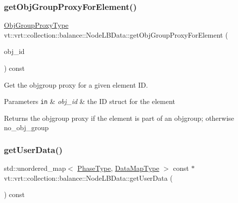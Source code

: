 \subsubsection{\texorpdfstring{get\+Obj\+Group\+Proxy\+For\+Element()}{getObjGroupProxyForElement()}}
{\footnotesize\ttfamily \hyperlink{namespacevt_ad7cae989df485fccca57f0792a880a8e}{Obj\+Group\+Proxy\+Type} vt\+::vrt\+::collection\+::balance\+::\+Node\+L\+B\+Data\+::get\+Obj\+Group\+Proxy\+For\+Element (\begin{DoxyParamCaption}\item[{\hyperlink{namespacevt_1_1vrt_1_1collection_1_1balance_a9f5b53fafb270212279a4757d2c4cd28}{Element\+I\+D\+Struct}}]{obj\+\_\+id }\end{DoxyParamCaption}) const}



Get the objgroup proxy for a given element ID. 


\begin{DoxyParams}[1]{Parameters}
\mbox{\tt in}  & {\em obj\+\_\+id} & the ID struct for the element\\
\hline
\end{DoxyParams}
\begin{DoxyReturn}{Returns}
the objgroup proxy if the element is part of an objgroup; otherwise {\ttfamily no\+\_\+obj\+\_\+group} 
\end{DoxyReturn}
\mbox{\label{structvt_1_1vrt_1_1collection_1_1balance_1_1_node_l_b_data_a73b93e4e239cc32982d5474fca1f7b64}} 
\subsubsection{\texorpdfstring{get\+User\+Data()}{getUserData()}}
{\footnotesize\ttfamily std\+::unordered\+\_\+map$<$ \hyperlink{namespacevt_a46ce6733d5cdbd735d561b7b4029f6d7}{Phase\+Type}, \hyperlink{namespacevt_1_1vrt_1_1collection_1_1balance_acf152c668ed9e2e9c6b29784181d2435}{Data\+Map\+Type} $>$ const  $\ast$ vt\+::vrt\+::collection\+::balance\+::\+Node\+L\+B\+Data\+::get\+User\+Data (\begin{DoxyParamCaption}{ }\end{DoxyParamCaption}) const}



